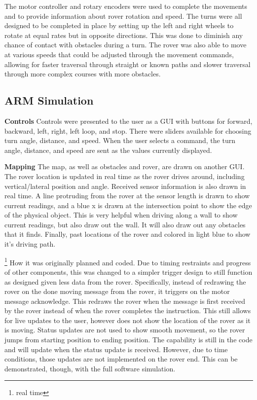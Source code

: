 {The motor controller and rotary encoders were used to complete the movements and to provide information about rover rotation and speed.  The turns were all designed to be completed in place by setting up the left and right wheels to rotate at equal rates but in opposite directions.  This was done to diminish any chance of contact with obstacles during a turn.  The rover was also able to move at various speeds that could be adjusted through the movement commands, allowing for faster traversal through straight or known paths and slower traversal through more complex courses with more obstacles. 


\subsection{ARM Simulation}
\textbf{Controls}
Controls were presented to the user as a GUI with buttons for forward, backward, left, right, left loop, and stop. There were sliders available for choosing turn angle, distance, and speed. When the user selects a command, the turn angle, distance, and speed are sent as the values currently displayed.

\textbf{Mapping}
The map, as well as obstacles and rover, are drawn on another GUI. The rover location is updated in real time\cite{real time} as the rover drives around, including vertical/lateral position and angle. Received sensor information is also drawn in real time. A line protruding from the rover at the sensor length is drawn to show current readings, and a blue x is drawn at the intersection point to show the edge of the physical object. This is very helpful when driving along a wall to show current readings, but also draw out the wall. It will also draw out any obstacles that it finds. Finally, past locations of the rover and colored in light blue to show it’s driving path.

\footnote{real time}
How it was originally planned and coded. Due to timing restraints and progress of other components, this was changed to a simpler trigger design to still function as designed given less data from the rover. Specifically, instead of redrawing the rover on the done moving message from the rover, it triggers on the motor message acknowledge. This redraws the rover when the message is first received by the rover instead of when the rover completes the instruction. This still allows for live updates to the user, however does not show the location of the rover as it is moving. Status updates are not used to show smooth movement, so the rover jumps from starting position to ending position. The capability is still in the code and will update when the status update is received. However, due to time conditions, those updates are not implemented on the rover end. This can be demonstrated, though, with the full software simulation.

}
